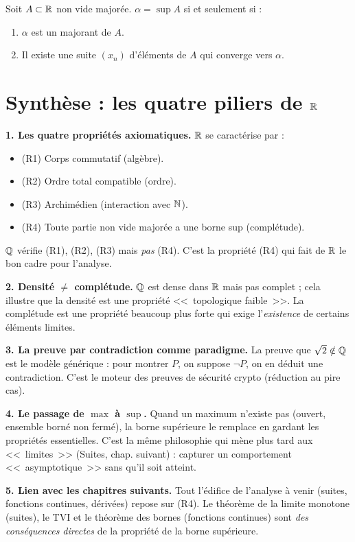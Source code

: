 \begin{propbox}
Soit $A \subset \mathbb{R}$ non vide majorée. $\alpha = \sup A$ si et seulement si :
\begin{enumerate}[leftmargin=1.5cm]
  \item[(i)] $\alpha$ est un majorant de $A$.
  \item[(ii)] Il existe une suite $(x_n)$ d'éléments de $A$ qui converge vers $\alpha$.
\end{enumerate}
\end{propbox}


\section{Synthèse : les quatre piliers de $\mathbb{R}$}

\begin{intuitionbox}

\textbf{1. Les quatre propriétés axiomatiques.} $\mathbb{R}$ se caractérise par :
\begin{itemize}[leftmargin=1cm]
  \item (R1) Corps commutatif (algèbre).
  \item (R2) Ordre total compatible (ordre).
  \item (R3) Archimédien (interaction avec $\mathbb{N}$).
  \item (R4) Toute partie non vide majorée a une borne sup (complétude).
\end{itemize}
$\mathbb{Q}$ vérifie (R1), (R2), (R3) mais \emph{pas} (R4). C'est la propriété (R4) qui fait de $\mathbb{R}$ le bon cadre pour l'analyse.

\textbf{2. Densité $\neq$ complétude.} $\mathbb{Q}$ est dense dans $\mathbb{R}$ mais pas complet ; cela illustre que la densité est une propriété <<~topologique faible~>>. La complétude est une propriété beaucoup plus forte qui exige l'\emph{existence} de certains éléments limites.

\textbf{3. La preuve par contradiction comme paradigme.} La preuve que $\sqrt{2} \notin \mathbb{Q}$ est le modèle générique : pour montrer $P$, on suppose $\neg P$, on en déduit une contradiction. C'est le moteur des preuves de sécurité crypto (réduction au pire cas).

\textbf{4. Le passage de $\max$ à $\sup$.} Quand un maximum n'existe pas (ouvert, ensemble borné non fermé), la borne supérieure le remplace en gardant les propriétés essentielles. C'est la même philosophie qui mène plus tard aux <<~limites~>> (Suites, chap. suivant) : capturer un comportement <<~asymptotique~>> sans qu'il soit atteint.

\textbf{5. Lien avec les chapitres suivants.} Tout l'édifice de l'analyse à venir (suites, fonctions continues, dérivées) repose sur (R4). Le théorème de la limite monotone (suites), le TVI et le théorème des bornes (fonctions continues) sont \emph{des conséquences directes} de la propriété de la borne supérieure.
\end{intuitionbox}


